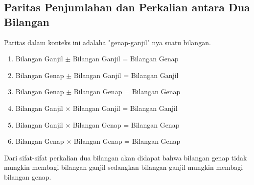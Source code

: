 \subsection{Paritas Penjumlahan dan Perkalian antara Dua Bilangan}
Paritas dalam konteks ini adalaha "genap-ganjil" nya suatu bilangan.
    \begin{enumerate}
        \item Bilangan Ganjil $\pm$ Bilangan Ganjil = Bilangan Genap 
        \item Bilangan Genap $\pm$ Bilangan Ganjil = Bilangan Ganjil 
        \item Bilangan Genap $\pm$ Bilangan Genap = Bilangan Genap 
        \item Bilangan Ganjil $\times$ Bilangan Ganjil = Bilangan Ganjil 
        \item Bilangan Ganjil $\times$ Bilangan Genap = Bilangan Genap 
        \item Bilangan Genap $\times$ Bilangan Genap = Bilangan Genap
    \end{enumerate}
    Dari sifat-sifat perkalian dua bilangan akan didapat bahwa bilangan genap tidak mungkin membagi bilangan ganjil sedangkan bilangan ganjil mungkin membagi bilangan genap. 


    